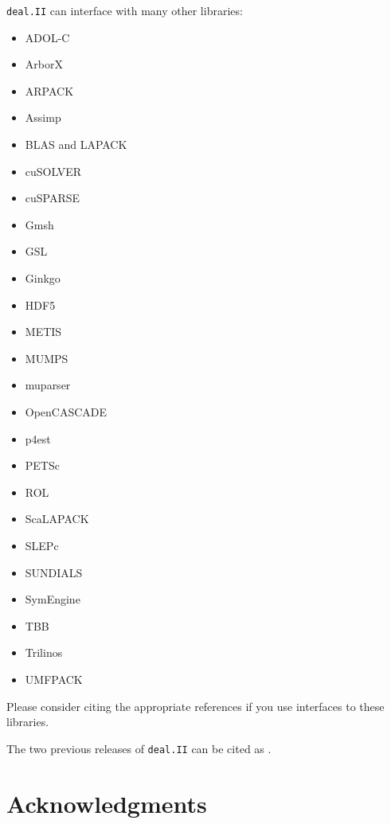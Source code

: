 \documentclass{ansarticle-preprint}
\newcommand{\specialword}[1]{\texttt{#1}}
\newcommand{\dealii}{{\specialword{deal.II}}\xspace}
\begin{document}
\dealii{} can interface with many other libraries:
\begin{multicols}{3}
  \begin{itemize}
    \item ADOL-C \cite{Griewank1996a,adol-c}
    \item ArborX \cite{lebrun2020arborx}
    \item ARPACK \cite{arpack}
    \item Assimp \cite{assimp}
    \item BLAS and LAPACK \cite{lapack}
    \item cuSOLVER \cite{cusolver}
    \item cuSPARSE \cite{cusparse}
    \item Gmsh \cite{geuzaine2009gmsh}
    \item GSL \cite{gsl2016}
    \item Ginkgo \cite{ginkgo-web-page}
    \item HDF5 \cite{hdf5}
    \item METIS \cite{karypis1998fast}
    \item MUMPS \cite{ADE00,MUMPS:1,MUMPS:2,mumps-web-page}
    \item muparser \cite{muparser-web-page}
    \item OpenCASCADE \cite{opencascade-web-page}
    \item p4est \cite{p4est}
    \item PETSc \cite{petsc-user-ref,petsc-web-page}
    \item ROL \cite{ridzal2014rapid}
    \item ScaLAPACK \cite{slug}
    \item SLEPc \cite{Hernandez:2005:SSF}
    \item SUNDIALS \cite{sundials}
    \item SymEngine \cite{symengine-web-page}
    \item TBB \cite{Rei07}
    \item Trilinos \cite{trilinos,trilinos-web-page}
    \item UMFPACK \cite{umfpack}
  \end{itemize}
\end{multicols}
Please consider citing the appropriate references if you use
interfaces to these libraries. 

The two previous releases of \dealii{} can be cited as
\cite{dealII91,dealII92}.


\section{Acknowledgments}
\end{document}
